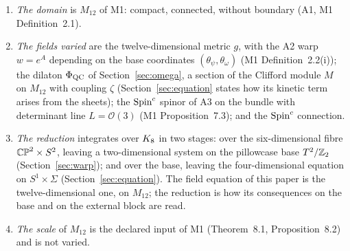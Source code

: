 \begin{definition}\label{def:scheme}
\begin{enumerate}[label=(\roman*),nosep]
\item \emph{The domain} is $M_{12}$ of M1: compact, connected, without
boundary (A1, M1 Definition~2.1).
\item \emph{The fields varied} are the twelve-dimensional metric $g$, with
the A2 warp $w=e^{A}$ depending on the base coordinates
$(\theta_{\psi},\theta_{\omega})$ (M1 Definition~2.2(i)); the dilaton
$\Phi_{\mathrm{QC}}$ of Section~\ref{sec:omega}, a section of the Clifford module $M$ on
$M_{12}$ with coupling $\zeta$ (Section~\ref{sec:equation} states how its kinetic term arises from the sheets);
the $\text{Spin}^c$ spinor of A3 on the bundle with determinant line
$L=\mathcal{O}(3)$ (M1 Proposition~7.3); and the $\text{Spin}^c$ connection.
\item \emph{The reduction} integrates over $K_8$ in two stages: over the
six-dimensional fibre $\mathbb{CP}^2\times S^2$, leaving a two-dimensional system
on the pillowcase base $T^2/\mathbb{Z}_2$ (Section~\ref{sec:warp}); and over the base, leaving
the four-dimensional equation on $S^{1}\times\Sigma$ (Section~\ref{sec:equation}). The field
equation of this paper is the twelve-dimensional one, on $M_{12}$; the
reduction is how its consequences on the base and on the external block
are read.
\item \emph{The scale} of $M_{12}$ is the declared input of M1
(Theorem~8.1, Proposition~8.2) and is not varied.
\end{enumerate}
\end{definition}

